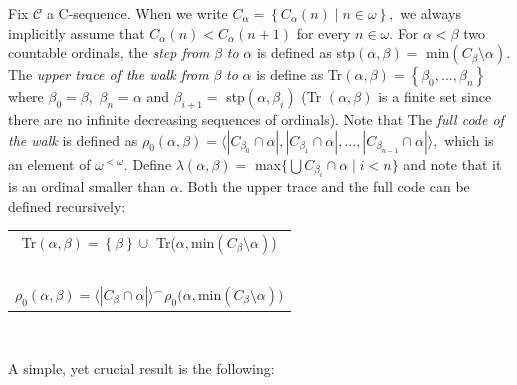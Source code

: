 \documentclass{article}
\begin{document}
Fix $\mathcal{C}$ a \textsf{C}-sequence. When we write $C_{\alpha}=\left\{
C_{\alpha}\left(  n\right)  \mid n\in\omega\right\}  ,$ we always implicitly
assume that $C_{\alpha}\left(  n\right)  <C_{\alpha}\left(  n+1\right)  $ for
every $n\in\omega.$ For $\alpha<\beta$ two countable ordinals, the \emph{step
from} $\beta$ \emph{to} $\alpha$ is defined as \textsf{stp}$\left(
\alpha,\beta\right)  =$ \textsf{min}$\left(  C_{\beta}\setminus\alpha\right)
.$ The \emph{upper trace of the walk from} $\beta$ \emph{to }$\alpha$ is
define as \textsf{Tr}$\left(  \alpha,\beta\right)  =\left\{  \beta
_{0},...,\beta_{n}\right\}  $ where $\beta_{0}=\beta,$ $\beta_{n}=\alpha$ and
$\beta_{i+1}=$ \textsf{stp}$\left(  \alpha,\beta_{i}\right)  $ (\textsf{Tr}%
$\left(  \alpha,\beta\right)  $ is a finite set since there are no infinite
decreasing sequences of ordinals). Note that The \emph{full code of the walk
}is defined as $\rho_{0}\left(  \alpha,\beta\right)  =\langle\left\vert
C_{\beta_{0}}\cap\alpha\right\vert ,\left\vert C_{\beta_{1}}\cap
\alpha\right\vert ,...,\left\vert C_{\beta_{n-1}}\cap\alpha\right\vert
\rangle,$ which is an element of $\omega^{<\omega}.$ Define $\lambda\left(
\alpha,\beta\right)  =$ \textsf{max}$\{\bigcup C_{\beta_{i}}\cap\alpha\mid
i<n\}$ and note that it is an ordinal smaller than $\alpha.$ Both the upper
trace and the full code can be defined recursively: \qquad\ \ \ 

\begin{center}%
\begin{tabular}
[c]{c}%
\textsf{Tr}$\left(  \alpha,\beta\right)  =\left\{  \beta\right\}  \cup$
\textsf{Tr(}$\alpha,$\textsf{min}$\left(  C_{\beta}\setminus\alpha\right)
$\textsf{)}\\
\ \ \ \ \\
$\rho_{0}\left(  \alpha,\beta\right)  =\langle\left\vert C_{\beta}\cap
\alpha\right\vert \rangle^{\frown}\rho_{0}(\alpha,$\textsf{min}$\left(
C_{\beta}\setminus\alpha\right)  )$%
\end{tabular}



\end{center}

\qquad\ \qquad\ \ \ \qquad\ \ \ 

A simple, yet crucial result is the following:
\end{document}
